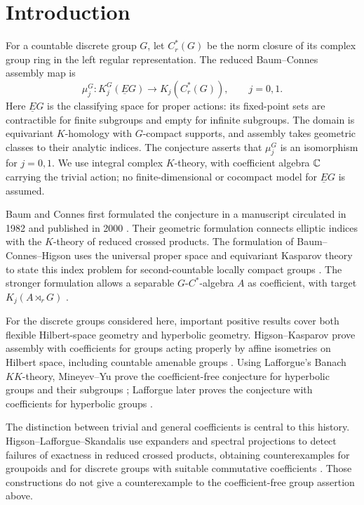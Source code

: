 \section{Introduction}\label{sec:introduction}

For a countable discrete group \(G\), let \(C_r^*(G)\) be the norm
closure of its complex group ring in the left regular representation.
The reduced Baum--Connes assembly map is
\[
\mu_j^G:K_j^G(\underline EG)\longrightarrow K_j(C_r^*(G)),
\qquad j=0,1.
\]
Here \(\underline EG\) is the classifying space for proper actions:
its fixed-point sets are contractible for finite subgroups and empty for
infinite subgroups. The domain is equivariant \(K\)-homology with
\(G\)-compact supports, and assembly takes geometric classes to their
analytic indices. The conjecture asserts that \(\mu_j^G\) is an
isomorphism for \(j=0,1\). We use integral complex \(K\)-theory, with
coefficient algebra \(\mathbb C\) carrying the trivial action; no
finite-dimensional or cocompact model for \(\underline EG\) is assumed.

Baum and Connes first formulated the conjecture in a manuscript
circulated in 1982 and published in 2000 \cite{BaumConnes2000}.
Their geometric formulation connects elliptic indices with the
\(K\)-theory of reduced crossed products. The formulation of
Baum--Connes--Higson uses the universal proper space and equivariant
Kasparov theory to state this index problem for second-countable locally
compact groups \cite[Conjecture~3.15]{BCH1994}.
The stronger formulation allows a separable \(G\)-\(C^*\)-algebra \(A\)
as coefficient, with target \(K_j(A\rtimes_rG)\)
\cite[Conjecture~9.6]{BCH1994}.

For the discrete groups considered here, important positive results
cover both flexible Hilbert-space geometry and hyperbolic geometry.
Higson--Kasparov prove assembly with coefficients for groups acting
properly by affine isometries on Hilbert space, including countable
amenable groups \cite[Theorem~9.1 and Corollary~9.2]{HigsonKasparov2001}.
Using Lafforgue's Banach \(KK\)-theory, Mineyev--Yu prove the
coefficient-free conjecture for hyperbolic groups and their subgroups
\cite[Theorems~19 and~20]{MineyevYu2002}; Lafforgue later proves
the conjecture with coefficients for hyperbolic groups
\cite[Theorem~0.4]{Lafforgue2012}.

The distinction between trivial and general coefficients is central to
this history.
Higson--Lafforgue--Skandalis use expanders and spectral projections to
detect failures of exactness in reduced crossed products, obtaining
counterexamples for groupoids and for discrete groups with suitable
commutative coefficients \cite[Section~7 and Remark~12]{HLS2002}.
Those constructions do not give a counterexample to the coefficient-free
group assertion above.


